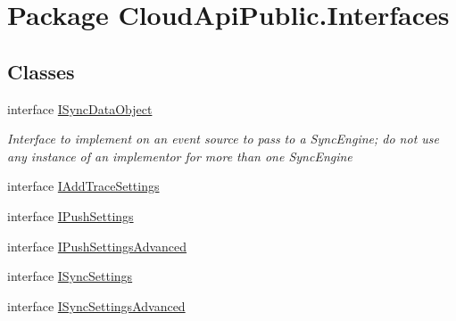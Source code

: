 \hypertarget{namespace_cloud_api_public_1_1_interfaces}{\section{Package Cloud\-Api\-Public.\-Interfaces}
\label{namespace_cloud_api_public_1_1_interfaces}
}
\subsection*{Classes}
\begin{DoxyCompactItemize}
\item 
interface \hyperlink{interface_cloud_api_public_1_1_interfaces_1_1_i_sync_data_object}{I\-Sync\-Data\-Object}
\begin{DoxyCompactList}\small\item\em Interface to implement on an event source to pass to a Sync\-Engine; do not use any instance of an implementor for more than one Sync\-Engine \end{DoxyCompactList}\item 
interface \hyperlink{interface_cloud_api_public_1_1_interfaces_1_1_i_add_trace_settings}{I\-Add\-Trace\-Settings}
\item 
interface \hyperlink{interface_cloud_api_public_1_1_interfaces_1_1_i_push_settings}{I\-Push\-Settings}
\item 
interface \hyperlink{interface_cloud_api_public_1_1_interfaces_1_1_i_push_settings_advanced}{I\-Push\-Settings\-Advanced}
\item 
interface \hyperlink{interface_cloud_api_public_1_1_interfaces_1_1_i_sync_settings}{I\-Sync\-Settings}
\item 
interface \hyperlink{interface_cloud_api_public_1_1_interfaces_1_1_i_sync_settings_advanced}{I\-Sync\-Settings\-Advanced}
\end{DoxyCompactItemize}

